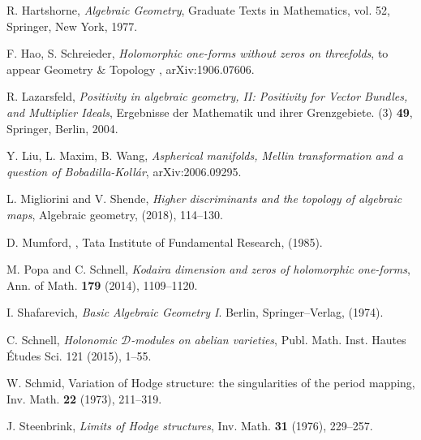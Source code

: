 \documentclass[a4paper,12pt,reqno]{amsart}
\theoremstyle{plain}
\theoremstyle{remark}
\begin{document}
\begin{thebibliography}{HKLR}
 R. Hartshorne, \textit{Algebraic Geometry}, Graduate Texts in Mathematics, vol. 52, Springer, New York,
1977.

 F. Hao, S. Schreieder, \textit{Holomorphic one-forms without zeros on threefolds}, to appear Geometry $\&$ Topology , arXiv:1906.07606.


 R. Lazarsfeld, \textit{Positivity in algebraic geometry, II: Positivity for Vector Bundles, and Multiplier Ideals}, Ergebnisse der Mathematik und ihrer Grenzgebiete. (3) \textbf{49}, Springer, Berlin, 2004.





 Y. Liu, L. Maxim, B. Wang, \textit{Aspherical manifolds, Mellin transformation and a question of Bobadilla-Koll\'ar}, arXiv:2006.09295.

 L. Migliorini and V. Shende, \textit{Higher discriminants and the topology of algebraic maps}, Algebraic geometry, (2018), 114--130.

 D. Mumford, , Tata Institute of Fundamental Research, (1985).

 M. Popa and C. Schnell, \textit{Kodaira dimension and zeros of holomorphic one-forms}, Ann. of Math. \textbf{179} (2014), 1109--1120.


 I. Shafarevich, \textit{Basic Algebraic Geometry I}. Berlin, Springer--Verlag, (1974).

C. Schnell, {\it  Holonomic $\mathcal{D}$-modules on abelian varieties},
Publ. Math. Inst. Hautes \'{E}tudes Sci. 121 (2015), 1--55.

 W. Schmid, Variation of Hodge structure: the singularities of the period mapping, Inv. Math. \textbf{22} (1973), 211--319.

 J. Steenbrink, \textit{Limits of Hodge structures}, Inv. Math. \textbf{31} (1976), 229--257.





\end{thebibliography}
\end{document}
